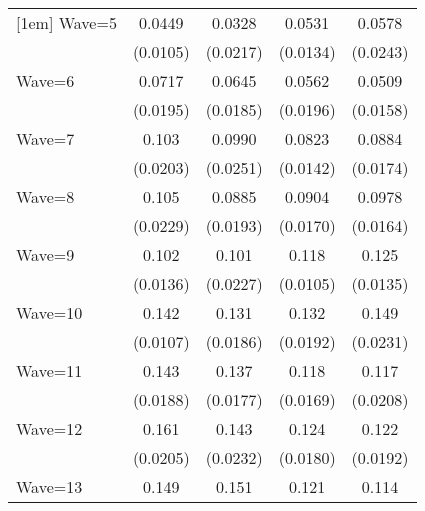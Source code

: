 {\begin{tabular}{l*{4}{c}}
[1em]
Wave=5              &      0.0449\sym{***}&      0.0328         &      0.0531\sym{***}&      0.0578\sym{*}  \\
                    &    (0.0105)         &    (0.0217)         &    (0.0134)         &    (0.0243)         \\
[1em]
Wave=6              &      0.0717\sym{***}&      0.0645\sym{***}&      0.0562\sym{**} &      0.0509\sym{**} \\
                    &    (0.0195)         &    (0.0185)         &    (0.0196)         &    (0.0158)         \\
[1em]
Wave=7              &       0.103\sym{***}&      0.0990\sym{***}&      0.0823\sym{***}&      0.0884\sym{***}\\
                    &    (0.0203)         &    (0.0251)         &    (0.0142)         &    (0.0174)         \\
[1em]
Wave=8              &       0.105\sym{***}&      0.0885\sym{***}&      0.0904\sym{***}&      0.0978\sym{***}\\
                    &    (0.0229)         &    (0.0193)         &    (0.0170)         &    (0.0164)         \\
[1em]
Wave=9              &       0.102\sym{***}&       0.101\sym{***}&       0.118\sym{***}&       0.125\sym{***}\\
                    &    (0.0136)         &    (0.0227)         &    (0.0105)         &    (0.0135)         \\
[1em]
Wave=10             &       0.142\sym{***}&       0.131\sym{***}&       0.132\sym{***}&       0.149\sym{***}\\
                    &    (0.0107)         &    (0.0186)         &    (0.0192)         &    (0.0231)         \\
[1em]
Wave=11             &       0.143\sym{***}&       0.137\sym{***}&       0.118\sym{***}&       0.117\sym{***}\\
                    &    (0.0188)         &    (0.0177)         &    (0.0169)         &    (0.0208)         \\
[1em]
Wave=12             &       0.161\sym{***}&       0.143\sym{***}&       0.124\sym{***}&       0.122\sym{***}\\
                    &    (0.0205)         &    (0.0232)         &    (0.0180)         &    (0.0192)         \\
[1em]
Wave=13             &       0.149\sym{***}&       0.151\sym{***}&       0.121\sym{***}&       0.114\sym{***}\\

\end{tabular}}
